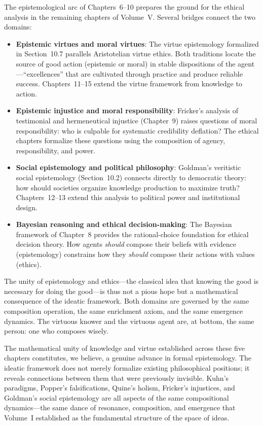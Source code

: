 \begin{remark}
The epistemological arc of Chapters~6--10 prepares the ground for the ethical
analysis in the remaining chapters of Volume~V. Several bridges connect the
two domains:

\begin{itemize}
\item \textbf{Epistemic virtues and moral virtues}: The virtue epistemology
  formalized in Section~10.7 parallels Aristotelian virtue ethics. Both
  traditions locate the source of good action (epistemic or moral) in stable
  dispositions of the agent---``excellences'' that are cultivated through
  practice and produce reliable success. Chapters~11--15 extend the virtue
  framework from knowledge to action.
\item \textbf{Epistemic injustice and moral responsibility}: Fricker's
  analysis of testimonial and hermeneutical injustice (Chapter~9) raises
  questions of moral responsibility: who is culpable for systematic credibility
  deflation? The ethical chapters formalize these questions using the
  composition of agency, responsibility, and power.
\item \textbf{Social epistemology and political philosophy}: Goldman's
  veritistic social epistemology (Section~10.2) connects directly to
  democratic theory: how should societies organize knowledge production
  to maximize truth? Chapters~12--13 extend this analysis to political
  power and institutional design.
\item \textbf{Bayesian reasoning and ethical decision-making}: The Bayesian
  framework of Chapter~8 provides the rational-choice foundation for ethical
  decision theory. How agents \emph{should} compose their beliefs with
  evidence (epistemology) constrains how they \emph{should} compose their
  actions with values (ethics).
\end{itemize}

The unity of epistemology and ethics---the classical idea that knowing the good
is necessary for doing the good---is thus not a pious hope but a mathematical
consequence of the ideatic framework. Both domains are governed by the same
composition operation, the same enrichment axiom, and the same emergence
dynamics. The virtuous knower and the virtuous agent are, at bottom,
the same person: one who composes wisely.

The mathematical unity of knowledge and virtue established across these five
chapters constitutes, we believe, a genuine advance in formal epistemology. The
ideatic framework does not merely formalize existing philosophical positions; it
reveals connections between them that were previously invisible. Kuhn's paradigms,
Popper's falsifications, Quine's holism, Fricker's injustices, and Goldman's
social epistemology are all aspects of the same compositional dynamics---the
same dance of resonance, composition, and emergence that Volume~I established
as the fundamental structure of the space of ideas.
\end{remark}
